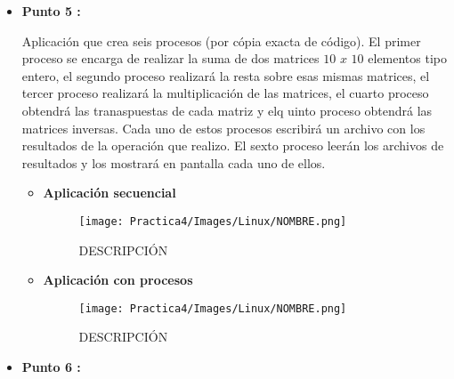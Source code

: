 \documentclass[12pt]{article}
\begin{document}
\begin{itemize}
                
                \item[\Checkmark] \textbf{Punto 5 :}
                    
                    Aplicación que crea seis procesos (por cópia exacta de código). El primer proceso se encarga de realizar la suma de dos matrices $10$ $x$ $10$ elementos tipo entero, el segundo proceso realizará la resta sobre esas mismas matrices, el tercer proceso realizará la multiplicación de las matrices, el cuarto proceso obtendrá las tranaspuestas de cada matriz y elq uinto proceso obtendrá las matrices inversas. Cada uno de estos procesos escribirá un archivo con los resultados de la operación que realizo. El sexto proceso leerán los archivos de resultados y los mostrará en pantalla cada uno de ellos.

                    \begin{itemize}
                        \item \textbf{Aplicación secuencial}
                            \begin{figure}[h!]
                                \centering
                                \texttt{[image: Practica4/Images/Linux/NOMBRE.png]}
                                \caption{DESCRIPCIÓN}
                            \end{figure}

                        
                        \item \textbf{Aplicación con procesos}
                            \begin{figure}[h!]
                                \centering
                                \texttt{[image: Practica4/Images/Linux/NOMBRE.png]}
                                \caption{DESCRIPCIÓN}
                            \end{figure}

                          
                    \end{itemize}
                
                \item[\Checkmark] \textbf{Punto 6 :}
                    

\end{itemize}
\end{document}
